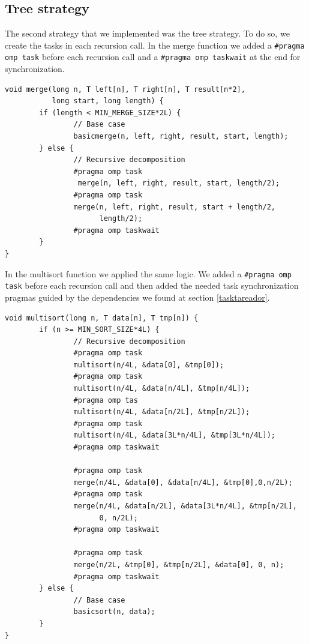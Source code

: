 \documentclass{article}
\begin{document}
\subsection{Tree strategy} \label{treeST}
\justify
The second strategy that we implemented was the tree strategy. To do so, we create the tasks in each recursion call. In the merge function we added a \texttt{\#pragma omp task} before each recursion call and a \texttt{\#pragma omp taskwait} at the end for synchronization.
\begin{lstlisting}
void merge(long n, T left[n], T right[n], T result[n*2],
           long start, long length) {
        if (length < MIN_MERGE_SIZE*2L) {
                // Base case
                basicmerge(n, left, right, result, start, length);
        } else {
                // Recursive decomposition
                #pragma omp task
                 merge(n, left, right, result, start, length/2);
                #pragma omp task
                merge(n, left, right, result, start + length/2,
                      length/2);
                #pragma omp taskwait
        }
}
\end{lstlisting}
\justify
In the multisort function we applied the same logic. We added a \texttt{\#pragma omp task} before each recursion call and then added the needed task synchronization pragmas guided by the dependencies we found at section \ref{tasktareador}.
\begin{lstlisting}
void multisort(long n, T data[n], T tmp[n]) {
        if (n >= MIN_SORT_SIZE*4L) {
                // Recursive decomposition
                #pragma omp task
                multisort(n/4L, &data[0], &tmp[0]);
                #pragma omp task
                multisort(n/4L, &data[n/4L], &tmp[n/4L]);
                #pragma omp tas
                multisort(n/4L, &data[n/2L], &tmp[n/2L]);
                #pragma omp task
                multisort(n/4L, &data[3L*n/4L], &tmp[3L*n/4L]);
                #pragma omp taskwait

                #pragma omp task
                merge(n/4L, &data[0], &data[n/4L], &tmp[0],0,n/2L);
                #pragma omp task
                merge(n/4L, &data[n/2L], &data[3L*n/4L], &tmp[n/2L],
                      0, n/2L);
                #pragma omp taskwait
                
                #pragma omp task
                merge(n/2L, &tmp[0], &tmp[n/2L], &data[0], 0, n);
                #pragma omp taskwait
        } else {
                // Base case
                basicsort(n, data);
        }
}       
\end{lstlisting}
\end{document}
